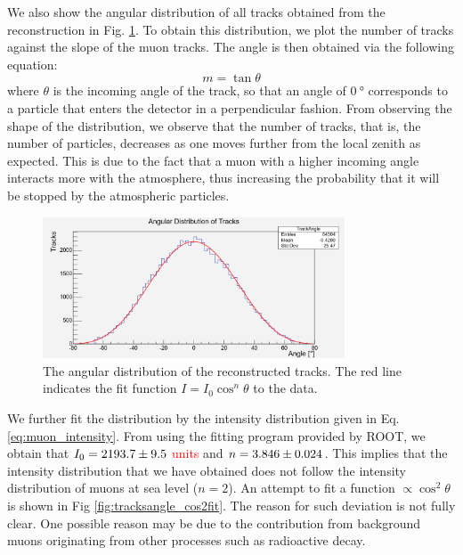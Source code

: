 \documentclass[a4paper]{report}
\numberwithin{equation}{section}
\begin{document}
We also show the angular distribution of all tracks obtained from the reconstruction in Fig. \ref{fig:tracksangle}. To obtain this distribution, we 
plot the number of tracks against the slope of the muon tracks. The angle is then obtained via the following equation:
\begin{equation}
	m = \tan \theta
\end{equation}
where $\theta$ is the incoming angle of the track, so that an angle of $\SI{0}{\degree}$ corresponds to a particle that enters the 
detector in a perpendicular fashion. From observing the shape of the distribution, we observe that the number of tracks, that is, 
the number of particles, decreases as one moves further from the local zenith as expected. This is due to the fact that a muon with a 
higher incoming angle interacts more with the atmosphere, thus increasing the probability that it will be stopped by the atmospheric
particles. \par 

\begin{figure}[!h]
	\centering
	\includegraphics[width=0.8\textwidth]{trackangle.png}
	\caption{The angular distribution of the reconstructed tracks. The red line indicates the fit function $I = I_0 \cos^n \theta$
			to the data. }
	\label{fig:tracksangle}
\end{figure}


We further fit the distribution by the intensity distribution given in Eq. \ref{eq:muon_intensity}. From using the fitting 
program provided by ROOT, we obtain that $I_0 = \num{2193.7 \pm 9.5}$ \textcolor{red}{units} and $n = \num{3.846 \pm 0.024}$. This implies that 
the intensity distribution that we have obtained does not follow the intensity distribution of muons at sea level ($n = 2$). 
An attempt to fit a function $\propto \cos ^2 \theta$ is shown in Fig \ref{fig:tracksangle_cos2fit}. The reason for such deviation
is not fully clear. One possible reason may be due to the contribution from background muons originating from other processes such as 
radioactive decay. 
\end{document}
